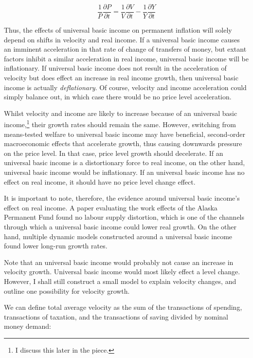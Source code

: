 \documentclass[paper=a4, fontsize=11pt,twoside]{scrartcl}
\begin{document}
\begin{equation}
\frac{1}{P}\frac{\partial P}{\partial t} = \frac{1}{V}\frac{\partial V}{\partial t} - \frac{1}{Y}\frac{\partial Y}{\partial t}
\end{equation}

Thus, the effects of universal basic income on permanent inflation will solely depend on shifts in velocity and real income. If a universal basic income causes an imminent acceleration in that rate of change of transfers of money, but extant factors inhibit a similar acceleration in real income, universal basic income will be inflationary. If universal basic income does not result in the acceleration of velocity but does effect an increase in real income growth, then universal basic income is actually \textit{deflationary}. Of course, velocity and income acceleration could simply balance out, in which case there would be no price level acceleration. 

Whilst velocity and income are likely to increase because of an universal basic income,\footnote{I discuss this later in the piece.} their growth rates should remain the same. However, switching from means-tested welfare to universal basic income may have beneficial, second-order macroeconomic effects that accelerate growth\autocite{olg1}, thus causing downwards pressure on the price level. In that case, price level growth should decelerate. If an universal basic income is a distortionary force to real income, on the other hand, universal basic income would be inflationary. If an universal basic income has no effect on real income, it should have no price level change effect. 

It is important to note, therefore, the evidence around universal basic income's effect on real income. A paper evaluating the work effects of the Alaska Permanent Fund\autocite{NBERw24312} found no labour supply distortion, which is one of the channels through which a universal basic income could lower real growth. On the other hand, multiple dynamic models constructed around a universal basic income found lower long-run growth rates\autocites{olg1, NBERw27351}.

Note that an universal basic income would probably not cause an increase in velocity growth. Universal basic income would most likely effect a level change. However, I shall still construct a small model to explain velocity changes, and outline one possibility for velocity growth. 

We can define total average velocity as the sum of the transactions of spending, transactions of taxation, and the transactions of saving divided by nominal money demand:
\end{document}
